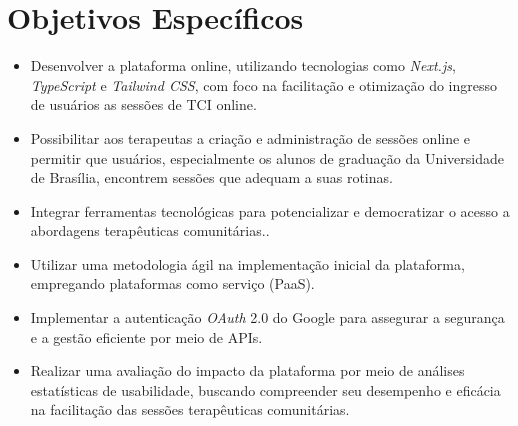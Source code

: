 \section*{Objetivos Específicos}
\begin{itemize}
        \item Desenvolver a plataforma online, utilizando tecnologias como \textit{Next.js}, \textit{TypeScript} e \textit{Tailwind CSS}, com foco na facilitação e otimização do ingresso de usuários as sessões de TCI online.
        \item Possibilitar aos terapeutas a criação e administração de sessões online e permitir que usuários, especialmente os alunos de graduação da Universidade de Brasília, encontrem sessões que adequam a suas rotinas.
        \item Integrar ferramentas tecnológicas para potencializar e democratizar o acesso a abordagens terapêuticas comunitárias..
       \item Utilizar uma metodologia ágil na implementação inicial da plataforma, empregando plataformas como serviço (PaaS).
       \item Implementar a autenticação \textit{OAuth} 2.0 do Google para assegurar a segurança e a gestão eficiente por meio de APIs.
        \item Realizar uma avaliação do impacto da plataforma por meio de análises estatísticas de usabilidade, buscando compreender seu desempenho e eficácia na facilitação das sessões terapêuticas comunitárias.
\end{itemize}
